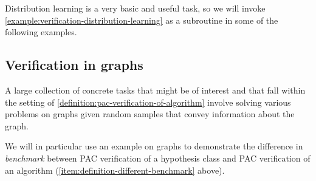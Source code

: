 Distribution learning is a very basic and useful task, so we will invoke \cref{example:verification-distribution-learning} as a subroutine in some of the following examples.

%

%

%
%

%
%

\subsection{Verification in graphs}

A large collection of concrete tasks that might be of interest and that fall within the setting of \cref{definition:pac-verification-of-algorithm} involve solving various problems on graphs given random samples that convey information about the graph.

We will in particular use an example on graphs to demonstrate the difference in \emph{benchmark} between PAC verification of a hypothesis class and PAC verification of an algorithm (\cref{item:definition-different-benchmark} above).

